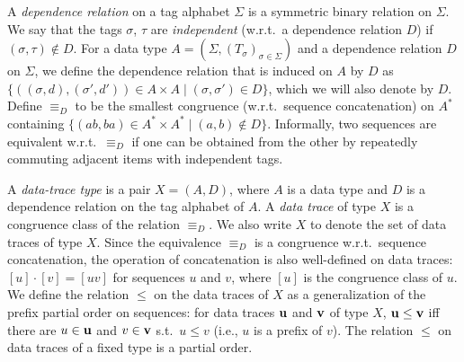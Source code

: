 \begin{definition}
A \emph{dependence relation} on a tag alphabet $\Sigma$ is a symmetric binary relation on $\Sigma$. We say that the tags $\sigma$, $\tau$ are \emph{independent} (w.r.t.\ a dependence relation $D$) if $(\sigma,\tau) \notin D$. For a data type $A = (\Sigma,(T_\sigma)_{\sigma \in \Sigma})$ and a dependence relation $D$ on $\Sigma$, we define the dependence relation that is induced on $A$ by $D$ as
$\{
   ((\sigma,d),(\sigma',d')) \in A \times A \mid
   (\sigma,\sigma') \in D
 \}
$,
which we will also denote by $D$. Define $\equiv_D$ to be the smallest congruence (w.r.t.\ sequence concatenation) on $A^*$ containing $\{ (ab,ba) \in A^* \times A^* \mid (a,b) \notin D \}$. Informally, two sequences are equivalent w.r.t.\ $\equiv_D$ if one can be obtained from the other by repeatedly commuting adjacent items with independent tags.
\end{definition}

\begin{definition}
A \emph{data-trace type} is a pair $X = (A,D)$, where $A$ is a data type and $D$ is a dependence relation on the tag alphabet of $A$. A \emph{data trace} of type $X$ is a congruence class of the relation $\equiv_D$. We also write $X$ to denote the set of data traces of type $X$. Since the equivalence $\equiv_D$ is a congruence w.r.t.\ sequence concatenation, the operation of concatenation is also well-defined on data traces: $[u] \cdot [v] = [uv]$ for sequences $u$ and $v$, where $[u]$ is the congruence class of $u$. We define the relation $\leq$ on the data traces of $X$ as a generalization of the prefix partial order on sequences:
for data traces $\mathbf{u}$ and $\mathbf{v}$ of type $X$, $\mathbf{u} \leq \mathbf{v}$ iff there are $u \in \mathbf{u}$ and $v \in \mathbf{v}$ s.t.\ $u \leq v$ (i.e., $u$ is a prefix of $v$). The relation $\leq$ on data traces of a fixed type is a partial order.
\end{definition}

